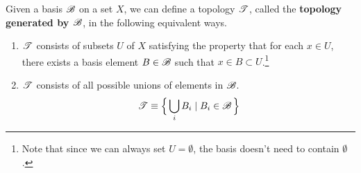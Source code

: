   \begin{theorem}
    Given a basis $\operatorname{\mathscr{B}}$ on a set $X$, we can define a topology $\operatorname{\mathscr{T}}$, called the \textbf{topology generated by $\operatorname{\mathscr{B}}$}, in the following equivalent ways. 
    \begin{enumerate}
      \item $\operatorname{\mathscr{T}}$ consists of subsets $U$ of $X$ satisfying the property that for each $x \in U$, there exists a basis element $B \in \operatorname{\mathscr{B}}$ such that $x \in B \subset U$.\footnote{Note that since we can always set $U = \emptyset$, the basis doesn't need to contain $\emptyset$. }
      \begin{center}
      \end{center}

      \item $\operatorname{\mathscr{T}}$ consists of all possible unions of elements in $\operatorname{\mathscr{B}}$. 
      \begin{equation}
        \operatorname{\mathscr{T}} \equiv \Big\{ \bigcup_i B_i \mid B_i \in \operatorname{\mathscr{B}}\Big\}
      \end{equation}
    \end{enumerate}
  \end{theorem} 
